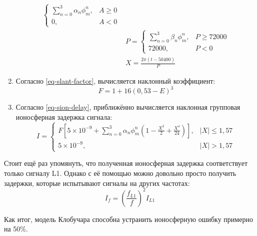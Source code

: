 \begin{enumerate}
\begin{equation}
\begin{aligned}
\begin{cases}
\sum\limits_{n=0}^3\alpha_n\phi_m^n,&A\geqslant 0 \\
0,&A<0 
\end{cases} \\
&P=\begin{cases}
\sum\limits_{n=0}^3\beta_n\phi_m^n,&P\geqslant 72000 \\
72000,&P<0 
\end{cases} \\
&X=\frac{2\pi(t-50400)}{P}   
\end{aligned}
\end{equation}
\item Согласно \eqref{eq-slant-factor}, вычисляется наклонный коэффициент:
\begin{equation}
F=1+16(0,53-E)^3
\end{equation}
\item Согласно \eqref{eq-sion-delay}, приближённо вычисляется наклонная групповая ионосферная задержка сигнала:
\begin{equation*}
I=\begin{cases}
F\left[5\times10^{-9}+\sum\limits_{n=0}^3\alpha_n\phi_m^n\left(1-\frac{X^2}{2}+\frac{X^4}{24}\right)\right],&|X|\leqslant1,57 \\
5\times10^{-9},&|X|>1,57
\end{cases}
\end{equation*}
\end{enumerate}

Стоит ещё раз упомянуть, что полученная ионосферная задержка соответствует только сигналу L1.
Однако с её помощью можно довольно просто получить задержки, которые испытывают сигналы на других частотах:
\begin{equation}
I_f=\left(\frac{f_{L1}}{f}\right)^2I_{L1}
\end{equation}

Как итог, модель Клобучара способна устранить ионосферную ошибку примерно на 50\%. 